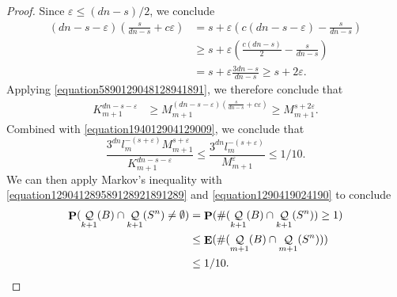 \documentclass[12pt,reqno]{article}
\numberwithin{equation}{section}
\DeclareMathOperator{\EE}{\mathbf{E}}
\DeclareMathOperator{\PP}{\mathbf{P}}
\DeclareMathOperator{\DQ}{\mathcal{Q}}
\begin{document}
\begin{proof}
    Since $\varepsilon \leq (dn - s)/2$, we conclude
    \begin{align*}
        \left( dn - s - \varepsilon \right) \left( \frac{s}{dn - s} + c\varepsilon \right) &= s + \varepsilon \left( c(dn - s - \varepsilon) - \frac{s}{dn - s} \right)\\
        &\geq s + \varepsilon \left( \frac{c(dn - s)}{2} - \frac{s}{dn - s} \right)\\
        &= s + \varepsilon \frac{3dn - s}{dn - s} \geq s + 2\varepsilon.
    \end{align*}
    Applying \eqref{equation5890129048128941891}, we therefore conclude that
    \begin{align*}
        K_{m+1}^{dn - s - \varepsilon} &\geq M_{m+1}^{(dn - s - \varepsilon) \left( \frac{s}{dn - s} + c\varepsilon \right)} \geq M_{m+1}^{s + 2 \varepsilon}.
    \end{align*}
    Combined with \eqref{equation194012904129009}, we conclude that
    \begin{equation} \label{equation1290419024190}
        \frac{3^{dn} l_m^{-(s + \varepsilon)} M_{m+1}^{s + \varepsilon}}{K_{m+1}^{dn - s - \varepsilon}} \leq \frac{3^{dn} l_m^{-(s + \varepsilon)}}{M_{m+1}^\varepsilon} \leq 1/10.
    \end{equation}
    We can then apply Markov's inequality with \eqref{equation129041289589128921891289} and \eqref{equation1290419024190} to conclude
    \begin{equation} \label{fourierdim2}
    \begin{split}
        \PP(\DQ_{k+1}(B) \cap \DQ_{k+1}(S^n) \neq \emptyset) &= \PP(\# (\DQ_{k+1}(B) \cap \DQ_{k+1}(S^n)) \geq 1)\\
        &\leq \EE(\#(\DQ_{m+1}(B) \cap \DQ_{m+1}(S^n)))\\
        &\leq 1/10. \qedhere
    \end{split}
    \end{equation}
\end{proof}
\end{document}
